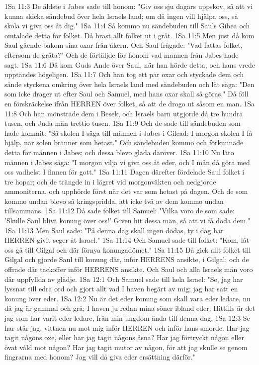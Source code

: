 1Sa 11:3  De äldste i Jabes sade till honom: "Giv oss sju dagars uppskov, så att vi kunna skicka sändebud över hela Israels land; om då ingen vill hjälpa oss, så skola vi giva oss åt dig."
1Sa 11:4  Så kommo nu sändebuden till Sauls Gibea och omtalade detta för folket. Då brast allt folket ut i gråt.
1Sa 11:5  Men just då kom Saul gående bakom sina oxar från åkern. Och Saul frågade: "Vad fattas folket, eftersom de gråta?" Och de förtäljde för honom vad mannen från Jabes hade sagt.
1Sa 11:6  Då kom Guds Ande över Saul, när han hörde detta, och hans vrede upptändes högeligen.
1Sa 11:7  Och han tog ett par oxar och styckade dem och sände styckena omkring över hela Israels land med sändebuden och lät säga: "Den som icke drager ut efter Saul och Samuel, med hans oxar skall så göras." Då föll en förskräckelse ifrån HERREN över folket, så att de drogo ut såsom en man.
1Sa 11:8  Och han mönstrade dem i Besek, och Israels barn utgjorde då tre hundra tusen, och Juda män trettio tusen.
1Sa 11:9  Och de sade till sändebuden som hade kommit: "Så skolen I säga till männen i Jabes i Gilead: I morgon skolen I få hjälp, när solen bränner som hetast." Och sändebuden kommo och förkunnade detta för männen i Jabes; och dessa blevo glada däröver.
1Sa 11:10  Nu läto männen i Jabes säga: "I morgon vilja vi giva oss åt eder, och I mån då göra med oss vadhelst I finnen för gott."
1Sa 11:11  Dagen därefter fördelade Saul folket i tre hopar; och de trängde in i lägret vid morgonväkten och nedgjorde ammoniterna, och upphörde först när det var som hetast på dagen. Och de som kommo undan blevo så kringspridda, att icke två av dem kommo undan tillsammans.
1Sa 11:12  Då sade folket till Samuel: "Vilka voro de som sade: 'Skulle Saul bliva konung över oss!' Given hit dessa män, så att vi få döda dem."
1Sa 11:13  Men Saul sade: "På denna dag skall ingen dödas, ty i dag har HERREN givit seger åt Israel."
1Sa 11:14  Och Samuel sade till folket: "Kom, låt oss gå till Gilgal och där förnya konungadömet."
1Sa 11:15  Då gick allt folket till Gilgal och gjorde Saul till konung där, inför HERRENS ansikte, i Gilgal; och de offrade där tackoffer inför HERRENS ansikte. Och Saul och alla Israels män voro där uppfyllda av glädje.
1Sa 12:1  Och Samuel sade till hela Israel: "Se, jag har lyssnat till edra ord och gjort allt vad I haven begärt av mig; jag har satt en konung över eder.
1Sa 12:2  Nu är det eder konung som skall vara eder ledare, nu då jag är gammal och grå; I haven ju redan mina söner ibland eder. Hittills är det jag som har varit eder ledare, från min ungdom ända till denna dag.
1Sa 12:3  Se har står jag, vittnen nu mot mig inför HERREN och inför hans smorde. Har jag tagit någons oxe, eller har jag tagit någons åsna? Har jag förtryckt någon eller övat våld mot någon? Har jag tagit mutor av någon, för att jag skulle se genom fingrarna med honom? Jag vill då giva eder ersättning därför."
